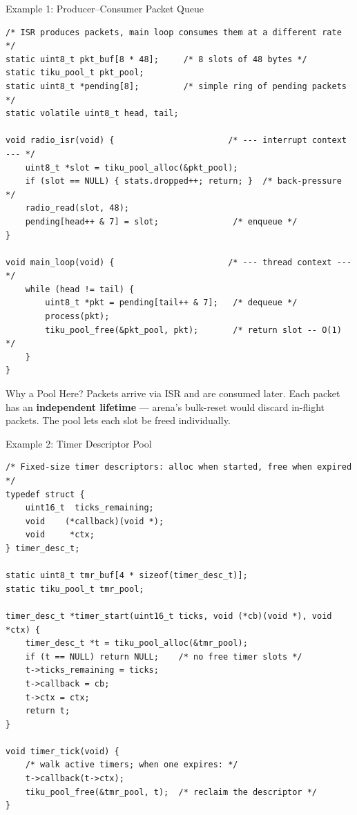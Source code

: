 \documentclass[aspectratio=169, 10pt]{beamer}
\begin{document}
\begin{frame}[fragile]{Example 1: Producer--Consumer Packet Queue}
\begin{lstlisting}[style=cstyle]
/* ISR produces packets, main loop consumes them at a different rate */
static uint8_t pkt_buf[8 * 48];     /* 8 slots of 48 bytes */
static tiku_pool_t pkt_pool;
static uint8_t *pending[8];         /* simple ring of pending packets */
static volatile uint8_t head, tail;

void radio_isr(void) {                       /* --- interrupt context --- */
    uint8_t *slot = tiku_pool_alloc(&pkt_pool);
    if (slot == NULL) { stats.dropped++; return; }  /* back-pressure */
    radio_read(slot, 48);
    pending[head++ & 7] = slot;               /* enqueue */
}

void main_loop(void) {                       /* --- thread context --- */
    while (head != tail) {
        uint8_t *pkt = pending[tail++ & 7];   /* dequeue */
        process(pkt);
        tiku_pool_free(&pkt_pool, pkt);       /* return slot -- O(1) */
    }
}
\end{lstlisting}

\begin{block}{Why a Pool Here?}
Packets arrive via ISR and are consumed later. Each packet has an
\textbf{independent lifetime} --- arena's bulk-reset would discard
in-flight packets. The pool lets each slot be freed individually.
\end{block}
\end{frame}

\begin{frame}[fragile]{Example 2: Timer Descriptor Pool}
\begin{lstlisting}[style=cstyle]
/* Fixed-size timer descriptors: alloc when started, free when expired */
typedef struct {
    uint16_t  ticks_remaining;
    void    (*callback)(void *);
    void     *ctx;
} timer_desc_t;

static uint8_t tmr_buf[4 * sizeof(timer_desc_t)];
static tiku_pool_t tmr_pool;

timer_desc_t *timer_start(uint16_t ticks, void (*cb)(void *), void *ctx) {
    timer_desc_t *t = tiku_pool_alloc(&tmr_pool);
    if (t == NULL) return NULL;    /* no free timer slots */
    t->ticks_remaining = ticks;
    t->callback = cb;
    t->ctx = ctx;
    return t;
}

void timer_tick(void) {
    /* walk active timers; when one expires: */
    t->callback(t->ctx);
    tiku_pool_free(&tmr_pool, t);  /* reclaim the descriptor */
}
\end{lstlisting}
\end{frame}
\end{document}
